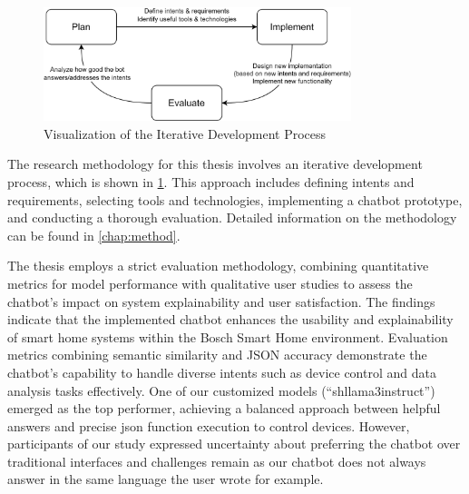 \begin{figure}[b]
\centering
\includegraphics[width=0.8\textwidth]{graphics/iterative-design.png}
\caption{Visualization of the Iterative Development Process}
\label{fig:iterative-design}
\end{figure}
The research methodology for this thesis involves an iterative development process, which is shown in \cref{fig:iterative-design}. This approach includes defining intents and requirements, selecting tools and technologies, implementing a chatbot prototype, and conducting a thorough evaluation. Detailed information on the methodology can be found in \cref{chap:method}.

The thesis employs a strict evaluation methodology, combining quantitative metrics for model performance with qualitative user studies to assess the chatbot's impact on system explainability and user satisfaction.
The  findings indicate that the implemented chatbot enhances the usability and explainability of smart home systems within the Bosch Smart Home environment. Evaluation metrics combining semantic similarity and JSON accuracy demonstrate the chatbot's capability to handle diverse intents such as device control and data analysis tasks effectively. One of our customized models (``shllama3instruct'') emerged as the top performer, achieving a balanced approach between helpful answers and precise \gls{json} function execution to control devices.
However, participants of our study expressed uncertainty about preferring the chatbot over traditional interfaces and challenges remain as our chatbot does not always answer in the same language the user wrote for example.

